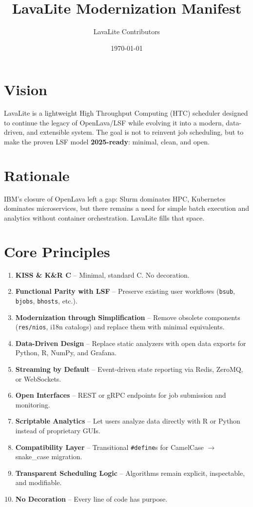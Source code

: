 \documentclass[11pt,a4paper]{article}
\title{\textbf{LavaLite Modernization Manifest}}
\author{LavaLite Contributors}
\date{\today}
\begin{document}
\maketitle

\section{Vision}
LavaLite is a lightweight High Throughput Computing (HTC) scheduler designed
to continue the legacy of OpenLava/LSF while evolving it into a modern,
data-driven, and extensible system.
The goal is not to reinvent job scheduling, but to make the proven LSF model
\textbf{2025-ready}: minimal, clean, and open.

\section{Rationale}
IBM's closure of OpenLava left a gap: Slurm dominates HPC,
Kubernetes dominates microservices, but there remains a need for
simple batch execution and analytics without container orchestration.
LavaLite fills that space.

\section{Core Principles}
\begin{enumerate}
  \item \textbf{KISS \& K\&R C} – Minimal, standard C. No decoration.
  \item \textbf{Functional Parity with LSF} – Preserve existing user workflows
        (\texttt{bsub}, \texttt{bjobs}, \texttt{bhosts}, etc.).
  \item \textbf{Modernization through Simplification} – Remove obsolete
        components (\texttt{res/nios}, i18n catalogs) and replace them with
        minimal equivalents.
  \item \textbf{Data-Driven Design} – Replace static analyzers with open
        data exports for Python, R, NumPy, and Grafana.
  \item \textbf{Streaming by Default} – Event-driven state reporting via
        Redis, ZeroMQ, or WebSockets.
  \item \textbf{Open Interfaces} – REST or gRPC endpoints for job
        submission and monitoring.
  \item \textbf{Scriptable Analytics} – Let users analyze data directly
        with R or Python instead of proprietary GUIs.
  \item \textbf{Compatibility Layer} – Transitional \texttt{\#define}s for
        CamelCase $\rightarrow$ snake\_case migration.
  \item \textbf{Transparent Scheduling Logic} – Algorithms remain explicit,
        inspectable, and modifiable.
  \item \textbf{No Decoration} – Every line of code has purpose.
\end{enumerate}
\end{document}
